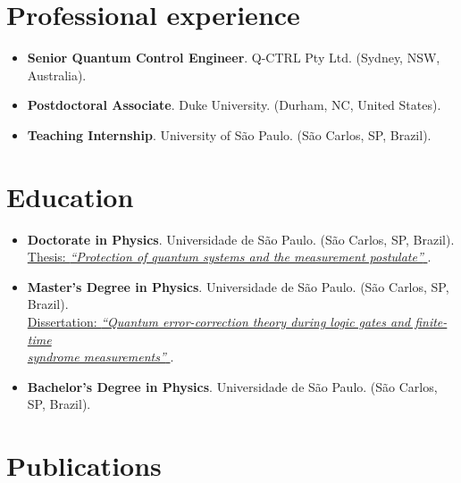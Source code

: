 \documentclass[a4paper]{article}
\begin{document}
\section*{Professional experience}
\begin{itemize} \item[]   \textbf{Senior Quantum Control Engineer}. Q-CTRL Pty Ltd. (Sydney, NSW, Australia).  
\item[]   \textbf{Postdoctoral Associate}. Duke University. (Durham, NC, United States).  
\item[]   \textbf{Teaching Internship}. University of São Paulo. (São Carlos, SP, Brazil).  
 \end{itemize}\section*{Education}
\begin{itemize} \item[]   \textbf{Doctorate in Physics}. Universidade de São Paulo. (São Carlos, SP, Brazil). \href{https://teses.usp.br/teses/disponiveis/76/76131/tde-20012017-090107/en.php}{
 \\ \makebox[2cm]{} Thesis: \textit{“Protection of quantum systems and the measurement postulate”} }.  
\item[]   \textbf{Master's Degree in Physics}. Universidade de São Paulo. (São Carlos, SP, Brazil). \href{https://teses.usp.br/teses/disponiveis/76/76131/tde-26042012-144241/en.php}{
 \\ \makebox[2cm]{} Dissertation: \textit{“Quantum error-correction theory during logic gates and finite-time 
 \\ \makebox[2cm]{} syndrome measurements”} }.  
\item[]   \textbf{Bachelor's Degree in Physics}. Universidade de São Paulo. (São Carlos, SP, Brazil).  
 \end{itemize}\section*{Publications}
\end{document}

